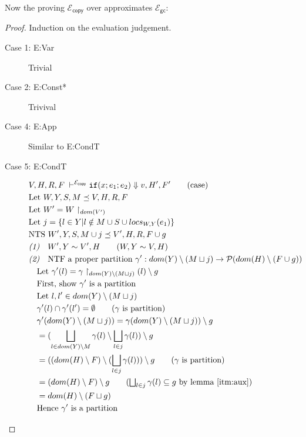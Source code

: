 \documentclass{easychair}
\newcommand{\ms}[1]{\ensuremath{\mathsf{#1}}}
\newcommand{\gcSem}{\ensuremath{\mathcal{E}_{\ms{gc}}}}
\newcommand{\copySem}{\ensuremath{\mathcal{E}_{\ms{copy}}}}
\theoremstyle{definition}
\begin{document}
Now the proving \copySem{} over approximates \gcSem{}:
\begin{proof}
Induction on the evaluation judgement.\\
\begin{description}
  \item[Case 1: E:Var] Trivial
  \item[Case 2: E:Const*] Trivival
  \item[Case 4: E:App] Similar to E:CondT
  \item[Case 5: E:CondT]
  \begin{align*}
		&V,H,R,F \; \vdash^{\copySem} \ifexabt{x}{e_1}{e_2} \Downarrow v, H',F' \tag{case}\\
		&\text{Let } W,Y,S,M \preceq V,H,R,F \\
		&\text{Let } W' = W \restriction_{dom(V')}\\
		&\text{Let } j = \{l \in Y | l \notin M \cup S \cup locs_{W,Y}(e_1) \}\\
		&\text{NTS } W',Y,S,M \cup j \preceq V',H,R,F \cup g\\
		&\emph{(1)}\quad W',Y \sim V',H \tag{$W,Y \sim V,H$}\\
		&\emph{(2)}\quad \text{NTF a proper partition }
		 \gamma' : dom(Y) \setminus (M \sqcup j) \to \mathcal{P}(dom(H)\setminus (F \cup g))  \\
		&\quad \text{Let } \gamma'(l) = \gamma \restriction_{dom(Y)\setminus(M \sqcup j)}(l) \setminus g\\
		&\quad \text{First, show $\gamma'$ is a partition}\\
		&\quad \text{Let } l, l' \in dom(Y) \setminus (M \sqcup j)\\
		&\quad \gamma'(l) \cap \gamma'(l') = \emptyset \tag{$\gamma$ is partition}\\
		&\quad \gamma'(dom(Y) \setminus (M \sqcup j)) = \gamma(dom(Y) \setminus (M \sqcup j)) \setminus g\\
		&\quad = (\bigsqcup_{l \in dom(Y) \setminus M} \gamma(l) \setminus \bigsqcup_{l \in j} \gamma(l)) 
			\setminus g\\
		&\quad = ((dom(H) \setminus F) \setminus (\bigsqcup_{l \in j} \gamma(l))) \setminus g 
			\tag{$\gamma$ is partition}\\
		&\quad = (dom(H) \setminus F) \setminus g 
			\tag{$\bigsqcup_{l \in j} \gamma(l) \subseteq g$ by lemma \ref{itm:aux}}\\
		&\quad = dom(H) \setminus (F \sqcup g)\\
		&\quad \text{Hence } \gamma' \text{ is a partition}\\

\end{align*}
\end{description}
\end{proof}
\end{document}

